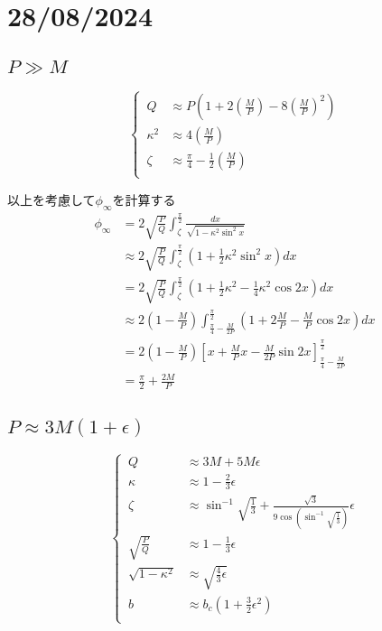 \documentclass[dvipdfmx]{report} %
\begin{document}
\chapter{28/08/2024}

\section{$P \gg M$}

\begin{equation*}
\left\{ \,
\begin{aligned}
	Q &\approx P \left( 1 + 2\left( \frac{M}{P} \right) - 8\left( \frac{M}{P} \right)^2 \right)\\
	\kappa^2 &\approx 4\left( \frac{M}{P} \right)\\
	\zeta &\approx \frac{\pi}{4} - \frac{1}{2} \left( \frac{M}{P} \right)\\
\end{aligned}
\right.
\end{equation*}

以上を考慮して$\phi_{\infty}$を計算する
\begin{equation*}
\begin{split}
	\phi_{\infty} &= 2\sqrt{ \frac{P}{Q} } \int^{\frac{\pi}{2}}_{\zeta} \frac{ dx }{\sqrt{ 1 - \kappa^2 \sin^2 x }}\\
	&\approx 2\sqrt{ \frac{P}{Q} } \int^{\frac{\pi}{2}}_{\zeta} \left( 1 + \frac{1}{2}\kappa^2 \sin^2 x \right) dx\\
	&= 2\sqrt{ \frac{P}{Q} } \int^{\frac{\pi}{2}}_{\zeta} \left( 1 + \frac{1}{2}\kappa^2 - \frac{1}{4}\kappa^2 \cos 2x \right) dx\\
	&\approx 2\left( 1 - \frac{M}{P} \right)\int^{\frac{\pi}{2}}_{\frac{\pi}{4} - \frac{M}{2P}} \left( 1 + 2\frac{M}{P} - \frac{M}{P} \cos 2x \right)dx\\
	&= 2\left( 1 - \frac{M}{P} \right) \left[ x + \frac{M}{P}x - \frac{M}{2P} \sin 2x\right]^{\frac{\pi}{2}}_{\frac{\pi}{4} - \frac{M}{2P}}\\
	&= \frac{\pi}{2} + \frac{2M}{P}
\end{split}
\end{equation*}

\section{$P \approx 3M( 1 + \epsilon )$}

\begin{equation*}
\left\{ \,
\begin{aligned}
	Q &\approx 3M + 5M\epsilon\\
	\kappa &\approx 1 - \frac{2}{3}\epsilon\\
	\zeta &\approx \sin^{-1} \sqrt{ \frac{1}{3} } + \frac{\sqrt{3}}{9\cos \left( \sin^{-1} \sqrt{ \frac{1}{3} } \right) }\epsilon\\
	\sqrt{ \frac{P}{Q} } &\approx 1 - \frac{1}{3}\epsilon\\
	\sqrt{ 1 - \kappa^2 } &\approx \sqrt{ \frac{4}{3} \epsilon }\\
	b &\approx b_c \left( 1 + \frac{3}{2}\epsilon^2 \right)\\
\end{aligned}
\right.
\end{equation*}
\end{document}
